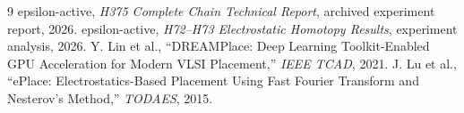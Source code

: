 \documentclass[UTF8,a4paper,11pt]{ctexrep}
\begin{document}
\begin{thebibliography}{9}
 epsilon-active, \emph{H375 Complete Chain Technical Report}, archived experiment report, 2026.
 epsilon-active, \emph{H72--H73 Electrostatic Homotopy Results}, experiment analysis, 2026.
 Y. Lin et al., ``DREAMPlace: Deep Learning Toolkit-Enabled GPU Acceleration for Modern VLSI Placement,'' \emph{IEEE TCAD}, 2021.
 J. Lu et al., ``ePlace: Electrostatics-Based Placement Using Fast Fourier Transform and Nesterov's Method,'' \emph{TODAES}, 2015.
\end{thebibliography}
\end{document}
